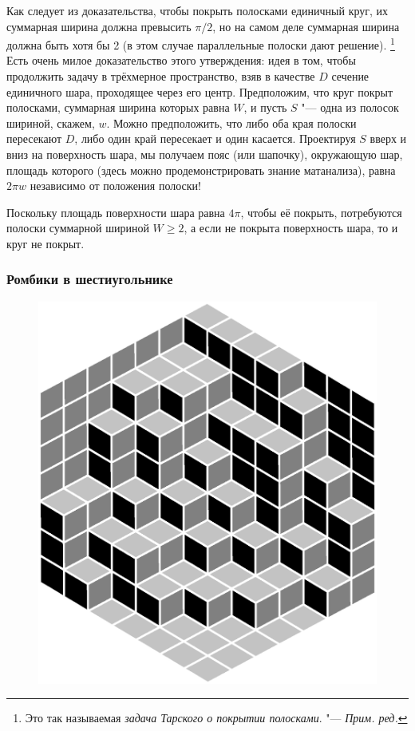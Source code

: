 \documentclass[twoside]{book}
\begin{document}
Как следует из доказательства, чтобы покрыть полосками единичный круг, их суммарная ширина должна превысить $\pi/2$, но на самом деле суммарная ширина должна быть хотя бы 2 (в этом случае параллельные полоски дают решение).%
\footnote{Это так называемая \emph{задача Тарского о покрытии полосками}. "--- \emph{Прим. ред.}}
Есть очень милое доказательство этого утверждения:
идея в том, чтобы продолжить задачу в трёхмерное пространство, взяв в качестве $D$ сечение единичного шара, проходящее через его центр.
Предположим, что круг покрыт полосками, суммарная ширина которых равна $W$, и пусть $S$ "--- одна из полосок шириной, скажем, $w$.
Можно предположить, что либо оба края полоски пересекают $D$, либо один край пересекает и один касается.
Проектируя $S$ вверх и вниз на поверхность шара, мы получаем пояс (или шапочку),
окружающую шар, площадь которого (здесь можно продемонстрировать знание матанализа), равна 
$2\pi w$ независимо от положения полоски!

Поскольку площадь поверхности шара равна $4\pi$, чтобы её покрыть, потребуются полоски суммарной шириной $W\ge 2$,
а если не покрыта поверхность шара, то и круг не покрыт.


\subsubsection*{Ромбики в шестиугольнике}%

\leavevmode

\begin{figure}[h]
\vskip-10mm
\centering
\includegraphics[scale=0.4]{Figs/Geometry/diamonds}
\vskip-15mm
\end{figure}
\end{document}
